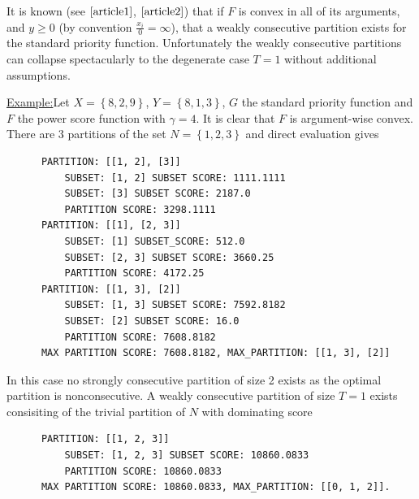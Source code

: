 \documentclass{article}
\theoremstyle{case}
\newenvironment{example}[1]{\par\noindent\underline{Example:}\space#1}{}
\begin{document}
It is known (see $\cite{article1}$, $\cite{article2}$) that if $F$ is convex in all of its arguments, and 
$y \geq 0$ (by convention $\frac{x_i}{0} = \infty$), that a weakly consecutive partition exists for the standard priority function. Unfortunately the weakly consecutive partitions can collapse spectacularly to the degenerate case $T=1$ without additional assumptions.

\begin{example}
Let $X = \left\lbrace 8, 2, 9\right\rbrace$, $Y = \left\lbrace  8, 1, 3\right\rbrace$, $G$ the standard priority function and $F$ the power score function with $\gamma = 4$. It is clear that $F$ is argument-wise convex. There are 3 partitions of the set $N = \left\lbrace 1,2,3 \right\rbrace$ and direct evaluation gives
\begin{verbatim}
      PARTITION: [[1, 2], [3]]
          SUBSET: [1, 2] SUBSET SCORE: 1111.1111
          SUBSET: [3] SUBSET SCORE: 2187.0
          PARTITION SCORE: 3298.1111
      PARTITION: [[1], [2, 3]]
          SUBSET: [1] SUBSET_SCORE: 512.0
          SUBSET: [2, 3] SUBSET SCORE: 3660.25
          PARTITION SCORE: 4172.25
      PARTITION: [[1, 3], [2]]
          SUBSET: [1, 3] SUBSET SCORE: 7592.8182
          SUBSET: [2] SUBSET SCORE: 16.0
          PARTITION SCORE: 7608.8182
      MAX PARTITION SCORE: 7608.8182, MAX_PARTITION: [[1, 3], [2]]
\end{verbatim}
In this case no strongly consecutive partition of size 2 exists as the optimal partition is nonconsecutive. A weakly consecutive partition of size $T = 1$ exists consisiting of the trivial partition of $N$ with dominating score
\begin{verbatim}
      PARTITION: [[1, 2, 3]]
          SUBSET: [1, 2, 3] SUBSET SCORE: 10860.0833
          PARTITION SCORE: 10860.0833
      MAX PARTITION SCORE: 10860.0833, MAX_PARTITION: [[0, 1, 2]].
\end{verbatim}  
\end{example}
\end{document}
